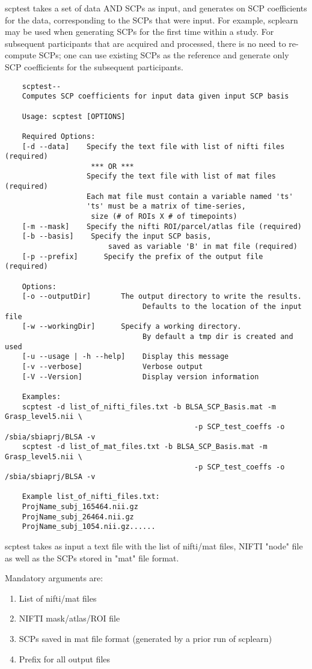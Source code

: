 \documentclass[12pt]{article}
\begin{document}
scptest takes a set of data AND SCPs as input, and generates on SCP coefficients for the data, corresponding to the SCPs that were input. For example, scplearn may be used when generating SCPs for the first time within a study. For subsequent participants that are acquired and processed, there is no need to re-compute SCPs; one can use existing SCPs as the reference and generate only SCP coefficients for the subsequent participants.
\begin{verbatim} 
    scptest--
    Computes SCP coefficients for input data given input SCP basis

    Usage: scptest [OPTIONS] 

    Required Options:
    [-d --data]    Specify the text file with list of nifti files (required) 
                    *** OR ***
                   Specify the text file with list of mat files (required) 
                   Each mat file must contain a variable named 'ts'
                   'ts' must be a matrix of time-series,
                    size (# of ROIs X # of timepoints)
    [-m --mask]    Specify the nifti ROI/parcel/atlas file (required)                
    [-b --basis]    Specify the input SCP basis, 
    					saved as variable 'B' in mat file (required)
    [-p --prefix]      Specify the prefix of the output file  (required)
    
    Options:
    [-o --outputDir]       The output directory to write the results. 
    							Defaults to the location of the input file
    [-w --workingDir]      Specify a working directory. 
    							By default a tmp dir is created and used
    [-u --usage | -h --help]    Display this message
    [-v --verbose]              Verbose output
    [-V --Version]              Display version information

    Examples:
    scptest -d list_of_nifti_files.txt -b BLSA_SCP_Basis.mat -m Grasp_level5.nii \
    										-p SCP_test_coeffs -o /sbia/sbiaprj/BLSA -v
    scptest -d list_of_mat_files.txt -b BLSA_SCP_Basis.mat -m Grasp_level5.nii \
    										-p SCP_test_coeffs -o /sbia/sbiaprj/BLSA -v
    
    Example list_of_nifti_files.txt:
    ProjName_subj_165464.nii.gz
    ProjName_subj_26464.nii.gz
    ProjName_subj_1054.nii.gz......
\end{verbatim}
scptest takes as input a text file with the list of nifti/mat files, NIFTI "node" file as well as the SCPs stored in "mat" file format.

Mandatory arguments are:
\begin{enumerate}
 \item List of nifti/mat files
 \item NIFTI mask/atlas/ROI file
 \item SCPs saved in mat file format (generated by a prior run of scplearn)
 \item Prefix for all output files
\end{enumerate}
\end{document}
